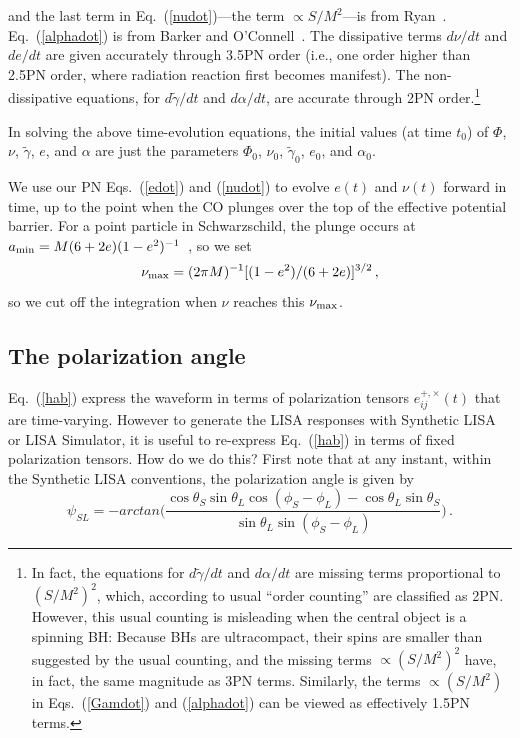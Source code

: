 \documentclass[11pt]{report}
\def\be{\begin{equation}}
\def\ee{\end{equation}}
\begin{document}
and the last term in Eq.\ (\ref{nudot})---the term $\propto S/M^2$---is from
Ryan~\cite{ryan96}.  Eq.~(\ref{alphadot}) is from Barker and
O'Connell~\cite{Barker}.
The dissipative terms $d\nu/dt$ and
$de/dt$ are given accurately through 3.5PN order (i.e., one order higher
than 2.5PN order, where radiation reaction first becomes manifest).
The non-dissipative equations, for $d\tilde\gamma/dt$ and $d\alpha/dt$,
are accurate through 2PN order.\footnote{In fact, the equations for
$d\tilde\gamma/dt$ and $d\alpha/dt$ are missing terms proportional
to $(S/M^2)^2$, which, according to usual ``order counting'' are
classified as 2PN. However, this usual counting is misleading when
the central object is a spinning BH: Because BHs are ultracompact, their spins
are smaller than suggested by the usual counting, and the missing terms
$\propto (S/M^2)^2$ have, in fact, the same magnitude as 3PN terms.
Similarly, the terms  $\propto (S/M^2)$ in Eqs.~(\ref{Gamdot}) and
(\ref{alphadot}) can be viewed as effectively 1.5PN terms.}

In solving the above time-evolution equations, the initial values (at time
$t_0$) of $\Phi$, $\nu$, $\tilde\gamma$, $e$, and $\alpha$ are just the parameters
$\Phi_0$, $\nu_0$, $\tilde\gamma_0$, $e_0$, and $\alpha_0$.

We use our PN Eqs.~(\ref{edot}) and (\ref{nudot})
to evolve $e(t)$ and $\nu(t)$ forward in time, up
to the point when the CO plunges over the top of the
effective potential barrier. For a point particle in Schwarzschild, the
plunge occurs at
$a_{\rm min} = M (6 + 2e)(1-e^2)^{-1}$~\cite{Cutler-Kennefick-Poisson},
so we set
\be\label{numax}
\nu_{\rm max} = (2\pi M)^{-1}[(1-e^2)/(6 + 2e)]^{3/2} \, ,
\ee
so we cut off the integration when $\nu$ reaches this $\nu_{\rm max}$.

\subsection{The polarization angle}
Eq.~(\ref{hab}) express the waveform in terms of polarization tensors $e^{+,\times}_{ij}(t)$ that
are time-varying.  However to generate the LISA responses with Synthetic LISA or
LISA Simulator, it is useful to re-express Eq.~(\ref{hab}) in terms of fixed polarization tensors.
How do we do this? First note that at any instant, within the Synthetic LISA conventions, the
polarization angle is given by 
\begin{equation}\label{psiSL}
\psi_{SL} = -arctan\bigl(\frac{\cos \theta_S \sin \theta_L \cos(\phi_S - \phi_L) - \cos\theta_L \sin\theta_S}{\sin\theta_L \sin(\phi_S-\phi_L)}\bigr) \,.
\end{equation}
\end{document}
